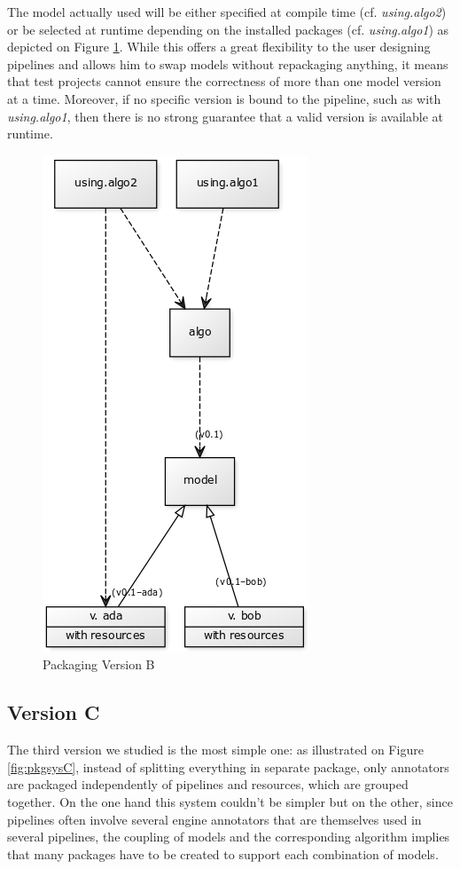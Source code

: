 \documentclass{article}
\newcommand{\id}[1]{\mbox{\textit{#1}}}
\begin{document}
The model actually used will be either specified at compile time (cf. \id{using.algo2}) or be selected at runtime depending on the installed packages (cf. \id{using.algo1}) as depicted on Figure \ref{fig:pkgsysB}. While this offers a great flexibility to the user designing pipelines and allows him to swap models without repackaging anything, it means that test projects cannot ensure the correctness of more than one model version at a time. Moreover, if no specific version is bound to the pipeline, such as with \id{using.algo1}, then there is no strong guarantee that a valid version is available at runtime.

\begin{figure}
\centering
\includegraphics{res/packaging_version_B.png}
\caption{Packaging Version B}
\label{fig:pkgsysB}
\end{figure}


\subsection{Version C}

The third version we studied is the most simple one: as illustrated on Figure \ref{fig:pkgsysC}, instead of splitting everything in separate package, only annotators are packaged independently of pipelines and resources, which are grouped together. On the one hand this system couldn't be simpler but on the other, since pipelines often involve several engine annotators that are themselves used in several pipelines, the coupling of models and the corresponding algorithm implies that many packages have to be created to support each combination of models.
\end{document}
